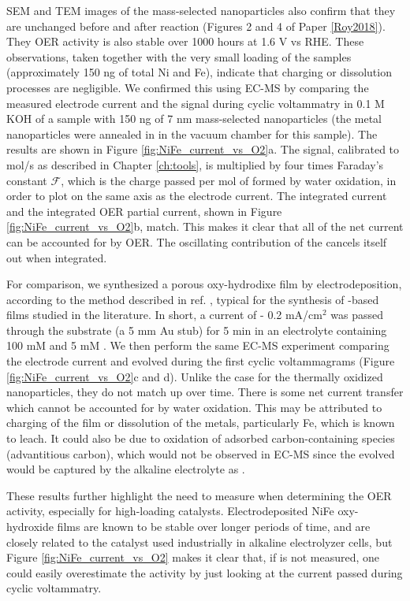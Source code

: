 SEM and TEM images of the mass-selected nanoparticles also confirm that they are unchanged before and after reaction (Figures 2 and 4 of Paper \ref{Roy2018}). They OER activity is also stable over 1000 hours at 1.6 V vs RHE. These observations, taken together with the very small loading of the samples (approximately 150 ng of total Ni and Fe), indicate that charging or dissolution processes are negligible. We confirmed this using EC-MS by comparing the measured electrode current and the  signal during cyclic voltammatry in 0.1 M KOH of a sample with 150 ng of 7 nm mass-selected  nanoparticles (the metal nanoparticles were annealed in  in the vacuum chamber for this sample). The results are shown in Figure \ref{fig:NiFe_current_vs_O2}a. The  signal, calibrated to mol/s as described in Chapter \ref{ch:tools}, is multiplied by four times Faraday's constant $\mathcal{F}$, which is the charge passed per mol of  formed by water oxidation, in order to plot on the same axis as the electrode current. The integrated current and the integrated OER partial current, shown in Figure \ref{fig:NiFe_current_vs_O2}b, match. This makes it clear that all of the net current can be accounted for by OER. The oscillating contribution of the  cancels itself out when integrated.

For comparison, we synthesized a porous  oxy-hydrodixe film by electrodeposition, according to the method described in ref. , typical for the synthesis of -based films studied in the literature\cite{Dionigi2016b}. In short, a current of - ​0.2 mA/cm$^2$ was passed through the substrate (a 5 mm Au stub) for 5 min in an electrolyte containing 100 mM  and 5 mM . We then perform the same EC-MS experiment comparing the electrode current and evolved  during the first cyclic voltammagrams (Figure \ref{fig:NiFe_current_vs_O2}c and d). Unlike the case for the thermally oxidized nanoparticles, they do not match up over time. There is some net current transfer which cannot be accounted for by water oxidation. This may be attributed to charging of the film or dissolution of the metals, particularly Fe, which is known to leach. It could also be due to oxidation of adsorbed carbon-containing species (advantitious carbon), which would not be observed in EC-MS since the evolved  would be captured by the alkaline electrolyte as .

These results further highlight the need to measure  when determining the OER activity, especially for high-loading catalysts. Electrodeposited NiFe oxy-hydroxide films are known to be stable over longer periods of time, and are closely related to the catalyst used industrially in alkaline electrolyzer cells, but Figure \ref{fig:NiFe_current_vs_O2} makes it clear that, if  is not measured, one could easily overestimate the activity by just looking at the current passed during cyclic voltammatry.